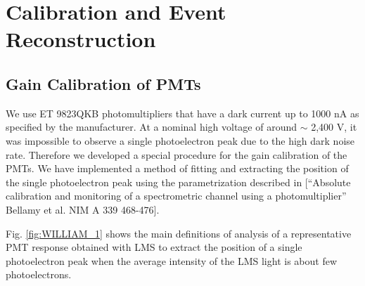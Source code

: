 \section{Calibration and Event Reconstruction}
\subsection{Gain Calibration of PMTs} 
We use ET 9823QKB photomultipliers that have a dark current up to 1000 nA as specified by the manufacturer. At a nominal high voltage of around $\sim$ 2,400 V, it was impossible to observe a single photoelectron peak due to the high dark noise rate. Therefore we developed a special procedure for the gain calibration of the PMTs. We have implemented a method of fitting and extracting the position of the single photoelectron peak using the parametrization described in [“Absolute calibration and monitoring of a spectrometric channel using a photomultiplier” Bellamy et al. NIM A 339 468-476]. \\ 

 
 \indent Fig. \ref{fig:WILLIAM_1} shows the main definitions of analysis of a representative PMT response obtained with LMS to extract the  position of a single photoelectron peak when the average intensity of the LMS light is about few photoelectrons. 

